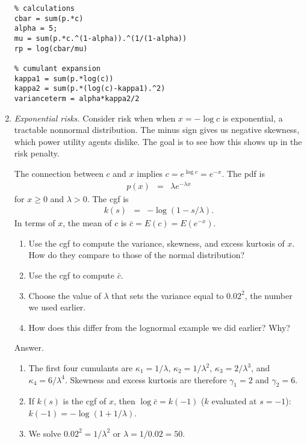 \documentclass[11pt]{article}
\begin{document}
\begin{enumerate}
\begin{verbatim}
% calculations
cbar = sum(p.*c)
alpha = 5;
mu = sum(p.*c.^(1-alpha)).^(1/(1-alpha))
rp = log(cbar/mu)

% cumulant expansion
kappa1 = sum(p.*log(c))
kappa2 = sum(p.*(log(c)-kappa1).^2)
varianceterm = alpha*kappa2/2
\end{verbatim}

\item {\it Exponential risks.\/}
Consider risk when when $x = - \log c $ is exponential,
a tractable nonnormal distribution.
The minus sign gives us negative skewness, which power utility agents
dislike.
The goal is to see how this shows up in the risk penalty.

The connection between $c$ and $x$ implies $c = e^{\log c} = e^{-x}$.
The pdf is
\begin{eqnarray*}
    p(x)  &=& \lambda e^{-\lambda x}
\end{eqnarray*}
for $x \geq 0$ and $\lambda > 0$.
The cgf is
\begin{eqnarray*}
    k(s)  &=& - \log \left( 1 - s/\lambda \right) .
\end{eqnarray*}
In terms of $x$, the mean of $c$ is $\bar{c} = E(c) = E (e^{-x})$.

\begin{enumerate}
\item Use the cgf to compute the variance, skewness, and excess kurtosis
of $x$.  How do they compare to those of the normal distribution?
\item Use the cgf to compute $\bar{c}$.
\item Choose the value of $\lambda$ that sets
the variance equal to $0.02^2$, the number we used earlier.
\item How does this differ from the lognormal example we did earlier?  Why?
\end{enumerate}
%
Answer.
\begin{enumerate}
\item The first four cumulants are
$\kappa_1 = 1/\lambda$,
$\kappa_2 = 1/\lambda^2$,
$\kappa_3 = 2/\lambda^3$,
and $\kappa_4 = 6/\lambda^4$.
Skewness and excess kurtosis are therefore
$\gamma_1 = 2$ and $\gamma_2 = 6$.

\item If $k(s)$ is the cgf of $x$,
then $\log \bar{c} = k(-1)$ ($k$ evaluated at $s=-1$):
$k(-1) = - \log (1 + 1/\lambda)$.

\item We solve $0.02^2 = 1/\lambda^2$ or $\lambda = 1/0.02 = 50$.


\end{enumerate}
\end{enumerate}
\end{document}
